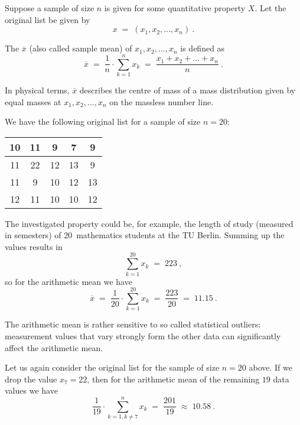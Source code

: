 
\begin{MIntro}

Suppose a sample of size $n$ is given for some quantitative property $X$. Let the original list be given by
$$
x\; =\; (x_{1},x_{2},\ldots ,x_{n})\: .
$$

\begin{MInfo}
The  $\overline{x}$ (also called sample mean) of $x_{1},x_{2},\ldots ,x_{n}$ is defined as
$$
\overline{x}\; =\; \frac{1}{n}\cdot \sum\limits_{k=1} ^{n} x_{k}\;=\;\frac{x_{1}+x_{2}+\ldots +x_{n}}{n}\: .
$$
\end{MInfo}

In physical terms, $\overline{x}$ describes the centre of mass of a mass distribution given by equal masses 
at $x_{1},x_{2},\ldots ,x_{n}$ on the massless number line.


\begin{MExample}
We have the following original list for a sample of size $n=20$:
\begin{center}
\begin{tabular}{|c|c|c|c|c|}
\hline
10 & 11 & 9 & 7 & 9 \\ \hline
11 & 22 & 12 & 13 & 9 \\ \hline
11 & 9 & 10 & 12 & 13 \\ \hline
12 & 11 & 10 & 10 & 12\\ \hline
\end{tabular}
\end{center}

The investigated property could be, for example, the length of study (measured in semesters) of $20$~mathematics 
students at the TU Berlin. Summing up the values results in
$$
\sum\limits_{k=1}^{20}x_{k}\; =\;223\: ,
$$
so for the arithmetic mean we have
$$
\overline{x}\;=\; \frac{1}{20}\cdot \sum\limits_{k=1}^{20}x_{k}\;=\; \frac{223}{20}\; =\; 11.15\: .
$$
\end{MExample}

The arithmetic mean is rather sensitive to so called statistical outliers: measurement values that 
vary strongly form the other data can significantly affect the arithmetic mean.

\begin{MExample}
Let us again consider the original list for the sample of size $n=20$ above. If we drop the value
$x_{7}=22$, then for the arithmetic mean of the remaining $19$ data values we have
$$
\frac{1}{19}\cdot \sum\limits_{k=1,k\neq 7}^{n}x_{k}\;=\; \frac{201}{19}\; \approx\; 10.58\: .
$$
\end{MExample}


\end{MIntro}
